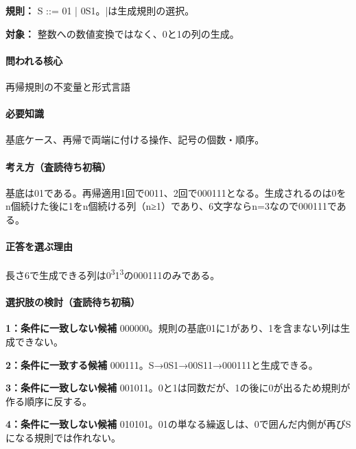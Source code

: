 \noindent\textbf{規則：} S ::= 01 | 0S1。|は生成規則の選択。\par

\noindent\textbf{対象：} 整数への数値変換ではなく、0と1の列の生成。\par

\paragraph{問われる核心} 再帰規則の不変量と形式言語

\paragraph{必要知識} 基底ケース、再帰で両端に付ける操作、記号の個数・順序。

\paragraph{考え方（査読待ち初稿）} 基底は01である。再帰適用1回で0011、2回で000111となる。生成されるのは0をn個続けた後に1をn個続ける列（n≥1）であり、6文字ならn=\allowbreak{}3なので000111である。

\paragraph{正答を選ぶ理由} 長さ6で生成できる列は0\textsuperscript{3}1\textsuperscript{3}の000111のみである。

\paragraph{選択肢の検討（査読待ち初稿）}\mbox{}\par

\noindent\textbf{1：条件に一致しない候補} 000000。規則の基底01に1があり、1を含まない列は生成できない。\par

\noindent\textbf{2：条件に一致する候補} 000111。S→0S1→00S11→000111と生成できる。\par

\noindent\textbf{3：条件に一致しない候補} 001011。0と1は同数だが、1の後に0が出るため規則が作る順序に反する。\par

\noindent\textbf{4：条件に一致しない候補} 010101。01の単なる繰返しは、0で囲んだ内側が再びSになる規則では作れない。\par

